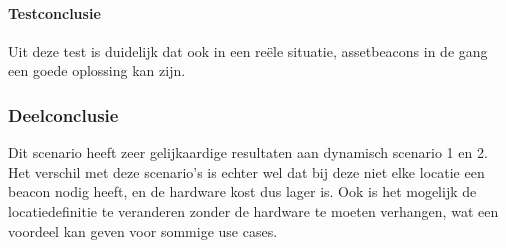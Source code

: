 \paragraph{Testconclusie}
Uit deze test is duidelijk dat ook in een reële situatie, assetbeacons in de gang een goede oplossing kan zijn.

\subsubsection{Deelconclusie}
Dit scenario heeft zeer gelijkaardige resultaten aan dynamisch scenario 1 en 2. Het verschil met deze scenario's is echter wel dat bij deze niet elke locatie een beacon nodig heeft, en de hardware kost dus lager is. Ook is het mogelijk de locatiedefinitie te veranderen zonder de hardware te moeten verhangen, wat een voordeel kan geven voor sommige use cases.

